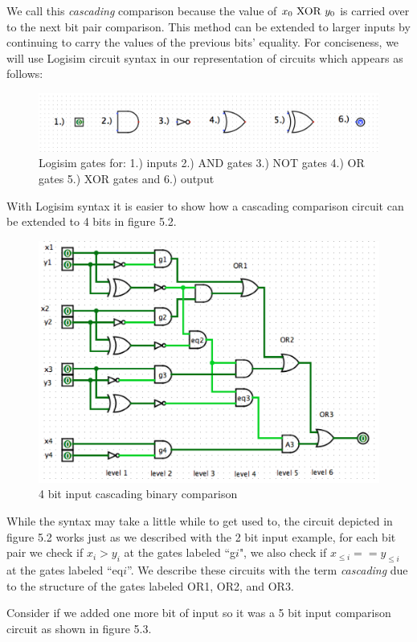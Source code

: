 \documentclass[12pt,twoside]{reedthesis}
\begin{document}
   We call this \textit{cascading} comparison because the value of $x_0\ \text{XOR} \ y_0$ is carried over to the next bit pair comparison. This method can be extended to larger inputs by continuing to carry the values of the previous bits' equality. For conciseness, we will use Logisim circuit syntax in our representation of circuits which appears as follows:
   
   
   
   
   \begin{figure}[h]
   \centering
   \includegraphics[scale = .35]{logisimgates}
   \caption{Logisim gates for: 1.) inputs 2.) AND gates 3.) NOT gates 4.) OR gates 5.) XOR gates and 6.) output }
   \label{subd}
   \end{figure}
   
   \par With Logisim syntax it is easier to show how a cascading comparison circuit can be extended to 4 bits in figure 5.2.
   
      \begin{figure}[htbp]
      \centering
   \includegraphics[scale = .55]{comp2_4}
   \caption{4 bit input cascading binary comparison}
   \label{subd}
   \end{figure}
   
   While the syntax may take a little while to get used to, the circuit depicted in figure 5.2  works just as we described with the 2 bit input example, for each bit pair we check if $x_i > y_i$ at the gates labeled ``g$i$", we also check if $x_{\leq i} == y_{\leq i}$ at the gates labeled ``eq$i$''. We describe these circuits with the term \textit{cascading} due to the structure of the gates labeled OR1, OR2, and OR3. 
   \par Consider if we added one more bit of input so it was a 5 bit input comparison circuit as shown in figure 5.3.
 
\end{document}
